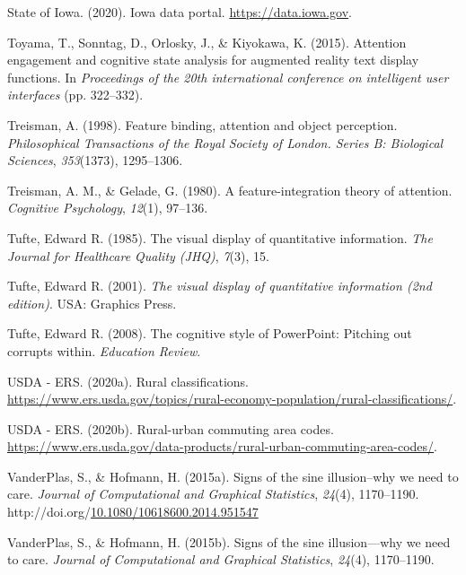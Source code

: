 \documentclass[print]{nuthesis}
\newlength{\cslhangindent}
\newenvironment{CSLReferences}[2]%
{\setlength{\parindent}{0pt}%
\everypar{\setlength{\hangindent}{\cslhangindent}}\ignorespaces}%
{\par}
\begin{document}
\begin{CSLReferences}{1}{0}
\leavevmode{}%
State of Iowa. (2020). Iowa data portal. \url{https://data.iowa.gov}.

\leavevmode{}%
Toyama, T., Sonntag, D., Orlosky, J., \& Kiyokawa, K. (2015). Attention engagement and cognitive state analysis for augmented reality text display functions. In \emph{Proceedings of the 20th international conference on intelligent user interfaces} (pp. 322--332).

\leavevmode{}%
Treisman, A. (1998). Feature binding, attention and object perception. \emph{Philosophical Transactions of the Royal Society of London. Series B: Biological Sciences}, \emph{353}(1373), 1295--1306.

\leavevmode{}%
Treisman, A. M., \& Gelade, G. (1980). A feature-integration theory of attention. \emph{Cognitive Psychology}, \emph{12}(1), 97--136.

\leavevmode{}%
Tufte, Edward R. (1985). The visual display of quantitative information. \emph{The Journal for Healthcare Quality (JHQ)}, \emph{7}(3), 15.

\leavevmode{}%
Tufte, Edward R. (2001). \emph{The visual display of quantitative information (2nd edition)}. USA: Graphics Press.

\leavevmode{}%
Tufte, Edward R. (2008). The cognitive style of PowerPoint: Pitching out corrupts within. \emph{Education Review}.

\leavevmode{}%
USDA - ERS. (2020a). Rural classifications. \url{https://www.ers.usda.gov/topics/rural-economy-population/rural-classifications/}.

\leavevmode{}%
USDA - ERS. (2020b). Rural-urban commuting area codes. \url{https://www.ers.usda.gov/data-products/rural-urban-commuting-area-codes/}.

\leavevmode{}%
VanderPlas, S., \& Hofmann, H. (2015a). Signs of the sine illusion--why we need to care. \emph{Journal of Computational and Graphical Statistics}, \emph{24}(4), 1170--1190. http://doi.org/\href{https://doi.org/10.1080/10618600.2014.951547}{10.1080/10618600.2014.951547}

\leavevmode{}%
VanderPlas, S., \& Hofmann, H. (2015b). Signs of the sine illusion---why we need to care. \emph{Journal of Computational and Graphical Statistics}, \emph{24}(4), 1170--1190.


\end{CSLReferences}
\end{document}

